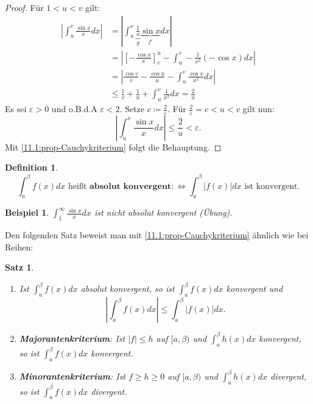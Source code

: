 \documentclass[12pt]{extreport} %
\theoremstyle{named}
\theoremstyle{itshape}
\newtheorem{satz}[unnamedtheorem]{Satz}
\newtheorem*{definition}{Definition}
\theoremstyle{normal}
\newtheorem*{beispiel*}{Beispiel}
\begin{document}
{\begin{proof}
	Für $1 < u < v$ gilt:
	\begin{align*}
		        |\int_{u}^{v} \frac{\sin x}{x} dx | & = | \int_{u}^{v} \underbrace{\frac{1}{x}}_{g} \underbrace{\sin x}_{f'} dx | \\
			& = | \left[ -\frac{\cos x}{x} \right]_{v}^{u} - \int_{u}^{v} - \frac{1}{x^{2}} (-\cos x) dx | \\
			& = | \frac{\cos v}{v} - \frac{\cos u}{u} - \int_{u}^{v} \frac{\cos x}{x^{2}} dx | \\
			& \leq \frac{1}{v} + \frac{1}{u} + \int_{u}^{v} \frac{1}{x^{2}} dx = \frac{2}{u}
	\end{align*}
	Es sei $\varepsilon > 0$ und o.B.d.A $\varepsilon < 2$. Setze $c \coloneqq \frac{2}{\varepsilon}$. Für $\frac{2}{\varepsilon}=c < u < v$ gilt nun:
	$$ | \int_{u}^{v} \frac{\sin x}{x} dx | \leq \frac{2}{u} < \varepsilon. $$
	Mit \ref{11.1:prop-Cauchykriterium} folgt die Behauptung.
\end{proof}

\begin{definition} ~\
	$$\int_{a}^{\beta} f(x) dx \text{ hei{\ss}t } \textbf{absolut konvergent} :\iff \int_{a}^{\beta} |f(x)| dx \text{ ist konvergent}.$$
\end{definition}

\begin{beispiel*}
$\int_{1}^{\infty} \frac{\sin x}{x} dx$ ist nicht absolut konvergent (Übung).
\end{beispiel*}


Den folgenden Satz beweist man mit \ref{11.1:prop-Cauchykriterium} ähnlich wie bei Reihen:

 
\begin{satz} ~\ \label{11.2:satz}
	\begin{enumerate}
		\item Ist $\int_{a}^{\beta} f(x) dx$ absolut konvergent, so ist $\int_{a}^{\beta} f(x) dx$ konvergent und
			$$ | \int_{a}^{\beta} f(x) dx | \leq \int_{a}^{\beta} |f(x)| dx. $$
		\item \textbf{Majorantenkriterium}: Ist $|f| \leq h$ auf $[a, \beta)$ und $\int_{a}^{\beta} h(x) dx$ konvergent, so ist $\int_{a}^{\beta} f(x) dx$ konvergent.
		\item \textbf{Minorantenkriterium}: Ist $f \geq h \geq 0$ auf $[a, \beta)$ und $\int_{a}^{\beta} h(x) dx$ divergent, so ist $\int_{a}^{\beta} f(x) dx$ divergent.
	\end{enumerate}	
\end{satz}


}
\end{document}
